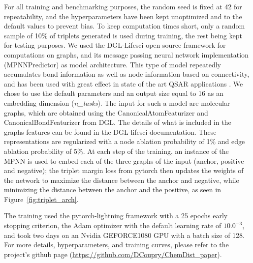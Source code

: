 \documentclass[doublespacing]{bmcart}
\begin{document}
For all training and benchmarking purposes, the random seed is fixed at 42 for repeatability, and the hyperparameters have been kept unoptimized and to the default values to prevent bias. To keep computation times short, only a random sample of 10\% of triplets generated is used during training, the rest being kept for testing purposes. We used the DGL-Lifesci open source framework for computations on graphs, and its message passing neural network implementation (MPNNPredictor)\cite{gilmer2017neural} as model architecture. This type of model repeatedly accumulates bond information as well as node information based on connectivity, and has been used with great effect in state of the art QSAR applications \cite{yang2019analyzing}. We chose to use the default parameters and an output size equal to 16 as an embedding dimension (\textit{n\_tasks}). The input for such a model are molecular graphs, which are obtained using the CanonicalAtomFeaturizer and CanonicalBondFeaturizer from DGL. The details of what is included in the graphs features can be found in the DGL-lifesci documentation. These representations are regularized with a node ablation probability of 1\% and edge ablation probability of 5\%. At each step of the training, an instance of the MPNN is used to embed each of the three graphs of the input (anchor, positive and negative); the triplet margin loss from pytorch\cite{NEURIPS2019_9015} then updates the weights of the network to maximize the distance between the anchor and negative, while minimizing the distance between the anchor and the positive, as seen in Figure~\ref{fig:triplet_arch}.



 The training used the pytorch-lightning framework \cite{falcon2019pytorch} with a 25 epochs early stopping criterion, the Adam optimizer with the default learning rate of $10.0^{-3}$, and took two days on an Nvidia GEFORCE1080 GPU with a batch size of 128. For more details, hyperparameters, and training curves, please refer to the project's github page (\href{https://github.com/DCoupry/ChemDist_paper}{https://github.com/DCoupry/ChemDist\_paper}).
 
\end{document}
